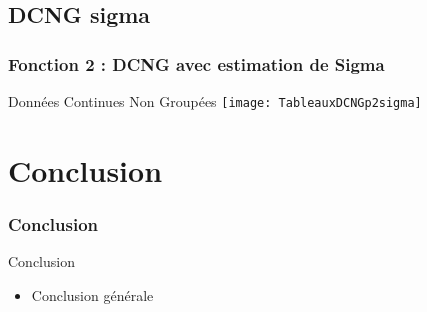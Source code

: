 \documentclass{beamer}
\begin{document}
\subsection{DCNG sigma}
\begin{frame}[label=Fonction 2 : DCNG avec estimation de sigma]
\frametitle{Fonction 2 : DCNG avec estimation de Sigma}
\begin{beamerboxesrounded}[shadow=true]{Données Continues Non Groupées}
\texttt{[image: TableauxDCNGp2sigma]}\\
\end{beamerboxesrounded}
\end{frame}

\section{Conclusion}
\begin{frame}[label=Conclusion]

\frametitle{Conclusion}
\begin{beamerboxesrounded}[shadow=true]{Conclusion}
		\begin{itemize}
			\item Conclusion générale
		\end{itemize}
\end{beamerboxesrounded}
\end{frame}
\end{document}
